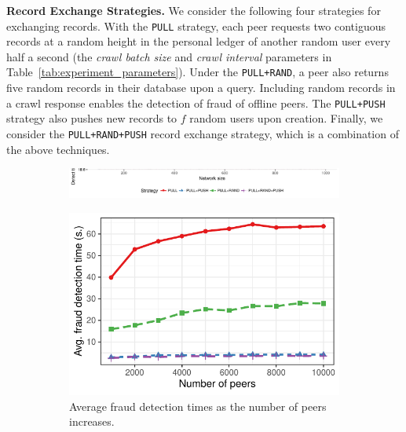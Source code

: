 \textbf{Record Exchange Strategies.}
We consider the following four strategies for exchanging records.
With the \texttt{PULL} strategy, each peer requests two contiguous records at a random height in the personal ledger of another random user every half a second (the \emph{crawl batch size} and \emph{crawl interval} parameters in Table~\ref{tab:experiment_parameters}).
Under the \texttt{PULL+RAND}, a peer also returns five random records in their database upon a query.
Including random records in a crawl response enables the detection of fraud of offline peers.
The \texttt{PULL+PUSH} strategy also pushes new records to $ f $ random users upon creation.
Finally, we consider the \texttt{PULL+RAND+PUSH} record exchange strategy, which is a combination of the above techniques.

\begin{figure}[t]
	\centering
	\begin{subfigure}{.8\columnwidth}
		\centering
		\includegraphics[width=\linewidth]{trustchain/assets/fraud_experiments_legend}
	\end{subfigure}
	\begin{subfigure}{.5\columnwidth}
		\centering
		\captionsetup{width=.9\linewidth}
		\includegraphics[width=\linewidth]{trustchain/assets/fraud_times_scalability}
		\caption{Average fraud detection times as the number of peers increases.}
		\label{fig:experiment_scalability_detection_times}
	\end{subfigure}%
	\begin{subfigure}{.5\columnwidth}

\end{subfigure}
\end{figure}
